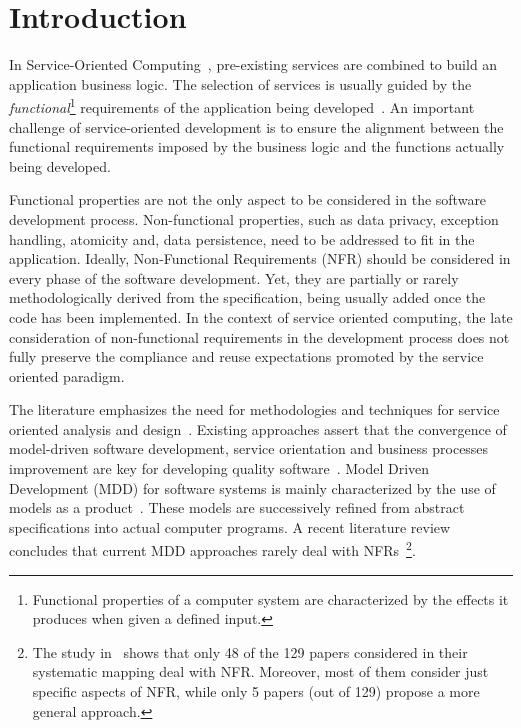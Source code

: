 \documentclass{singlecol-new}
\theoremstyle{TH}{
\newtheorem{lemma}{Lemma}
\newtheorem{theorem}[lemma]{Theorem}
\newtheorem{corrolary}[lemma]{Corrolary}
\newtheorem{conjecture}[lemma]{Conjecture}
\newtheorem{proposition}[lemma]{Proposition}
\newtheorem{claim}[lemma]{Claim}
\newtheorem{stheorem}[lemma]{Wrong Theorem}
\newtheorem{algorithm}{Algorithm}
}
\theoremstyle{THrm}{
\newtheorem{definition}{Definition}[section]
\newtheorem{question}{Question}[section]
\newtheorem{remark}{Remark}
\newtheorem{scheme}{Scheme}
}
\theoremstyle{THhit}{
\newtheorem{case}{Case}[section]
}
\theoremstyle{THhsl}{
\newtheorem{example}{Example}
}
\begin{document}
\section{Introduction}
\label{sec:intro}

In Service-Oriented Computing~\cite{Papazoglou2007}, pre-ex\-isting services are
combined to build an application business logic.
The selection of services is usually guided by the \textit{functional}\footnote{Functional properties of a computer system are characterized by the effects it produces when given a defined input.} requirements of the application being developed~\cite{2,decastro1,PapazoglouH06}.
An important challenge of service-o\-rien\-ted development is  to ensure the alignment between the functional requirements imposed by the business logic and the functions actually being developed.

Functional properties are not the only aspect to be considered in the software development process.
Non-functional properties, such as data privacy, exception handling, atomicity  and, data persistence, need to be addressed to fit in the application.
Ideally, Non-Functional Requirements (NFR) should be considered in every phase of the software development.
Yet, they are partially or rarely methodologically derived from the specification, being usually added once the code has been im\-ple\-men\-ted.
In the context of service oriented computing, the late consideration of non-functional requirements in the development process does not fully preserve the compliance and re\-use expectations promoted by the service oriented paradigm.

The literature emphasizes the need for meth\-od\-ol\-o\-gies and techniques for service oriented analysis and design~\cite{Papazoglou2007}.
Existing approaches assert that the convergence of model-driven soft\-ware development, service orientation  and  busi\-ness processes improvement are key for developing quality software~\cite{watson}.
Model Driven Development (MDD)  for software systems is mainly characterized by the use of models as a product~\cite{Selic03}.
These models are successively refined from abstract specifications into actual computer programs. 
A recent literature review  concludes that current MDD approaches rarely deal with NFRs~\cite{Ameller201542}\footnote{The study in~\cite{Ameller201542} shows that only 48 of the 129 papers considered in their systematic mapping deal with NFR. Moreover, most of them consider just specific aspects of NFR, while only 5 papers (out of 129) propose a more general approach.}.
\end{document}
